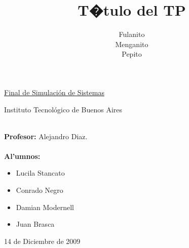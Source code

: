 \documentclass{article}
\title{T�tulo del TP}
\author{Fulanito\\Menganito\\Pepito}
\numberwithin{equation}{section}
\numberwithin{figure}{section}
\numberwithin{table}{section}
\begin{document}
\Large

%
%
\pagestyle{fancy}
\renewcommand{\sectionmark}[1]{\markboth{}{\thesection\ \ #1}}
\renewcommand{\footrulewidth}{0.6pt} %

\chead{}
\lfoot{}
\cfoot{\thepage}
\rfoot{}

%
%
\begin{titlepage}

%
%
%
	
	\begin{figure}
\begin{center}
	\end{center}
\end{figure}

\vspace{3cm}
%
	\begin{center}
		\underline{\Huge{Final de Simulaci\'on de Sistemas}}\\
\vspace{1cm}
	    \huge{Instituto Tecnol\'ogico de Buenos Aires
		\vspace{1cm}
		
}	\end{center}
	\vspace{1.5cm}
%
%


\noindent \huge{{\bf}
\\
\Large{{\bf Profesor:}} Alejandro Diaz. \\
\\
  \Large{{\bf Al'umnos:}}
\begin{itemize}
 \item Lucila Stancato \\
\item Conrado Negro \\
\item Damian Modernell \\
\item Juan Brasca 

\end{itemize}
 

	\vfill
  \begin{center}
		\huge{14 de Diciembre de 2009}
	\end{center}
}
\end{titlepage}
\end{document}
